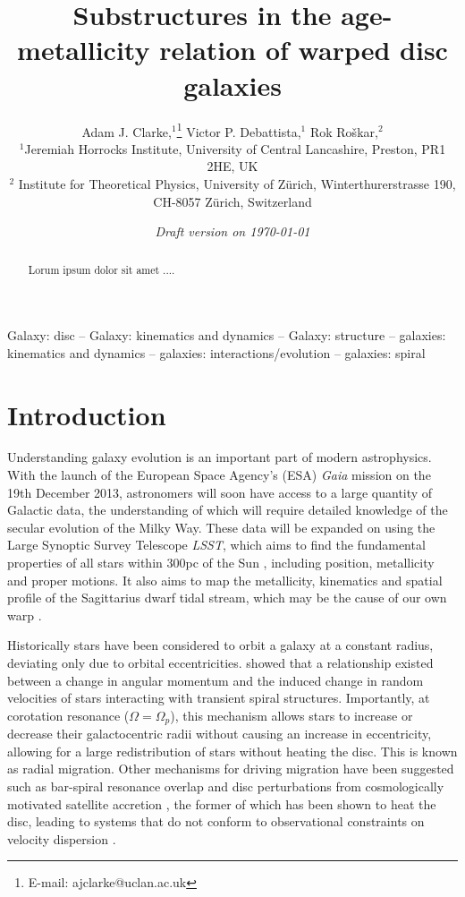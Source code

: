 \documentclass[usenatbib, useAMS,usegraphicx]{mn2e}
\title[AMRs of Warped Discs]{Substructures in the age-metallicity relation of warped disc galaxies}
\author[Clarke, Debattista and Ro\v{s}kar]
{Adam J. Clarke,$^1$\thanks{E-mail: ajclarke@uclan.ac.uk}  Victor P. Debattista,$^1$ Rok Ro\v{s}kar,$^2$ \\
$^1$Jeremiah Horrocks Institute, University of Central Lancashire, Preston, PR1 2HE, UK \\
$^2$ Institute for Theoretical Physics, University of Z\"{u}rich, Winterthurerstrasse  190, CH-8057 Z\"{u}rich, Switzerland}
\begin{document}
\date{{\it Draft version on \today}}
\pagerange{\pageref{firstpage}--\pageref{lastpage}} \pubyear{----}
\maketitle

\label{firstpage}

\begin{abstract}
Lorum ipsum dolor sit amet ....
\end{abstract}

\begin{keywords}
  Galaxy: disc --
  Galaxy: kinematics and dynamics --
  Galaxy: structure --
  galaxies: kinematics and dynamics --
  galaxies: interactions/evolution --
  galaxies: spiral
\end{keywords}


\section{Introduction} %

Understanding galaxy evolution is an important part of modern astrophysics. With the launch of the European Space Agency's (ESA) \emph{Gaia} mission on the 19th December 2013, astronomers will soon have access to a large quantity of Galactic data, the understanding of which will require detailed knowledge of the secular evolution of the Milky Way. These data will be expanded on using the Large Synoptic Survey Telescope \emph{LSST}, which aims to find the fundamental properties of all stars within 300pc of the Sun \citep{Ivezic2008}, including position, metallicity and proper motions. It also aims to map the metallicity, kinematics and spatial profile of the Sagittarius dwarf tidal stream, which may be the cause of our own warp \citep{Weinberg1998}.

Historically stars have been considered to orbit a galaxy at a constant radius, deviating only due to orbital eccentricities. \cite{sellwood2002} showed that a relationship existed between a change in angular momentum and the induced change in random velocities of stars interacting with transient spiral structures. Importantly, at corotation  resonance ($\Omega = \Omega_{p}$), this mechanism allows stars to increase or decrease their galactocentric radii without causing an increase in eccentricity, allowing for a large redistribution of stars without heating the disc. This is known as radial migration. Other mechanisms for driving migration have been suggested such as bar-spiral resonance overlap \citep{minchev2010, minchev2011} and disc perturbations from cosmologically motivated satellite accretion \citep{bird2012}, the former of which has been shown to heat the disc, leading to systems that do not conform to observational constraints on velocity dispersion \citep{roskar2011}.
\end{document}
